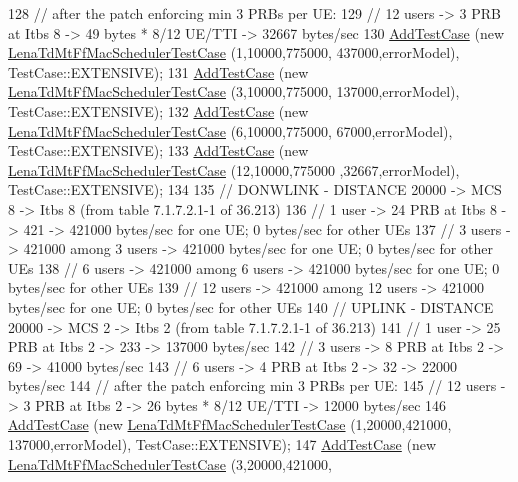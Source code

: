 \begin{DoxyCode}
128   \textcolor{comment}{// after the patch enforcing min 3 PRBs per UE:}
129   \textcolor{comment}{// 12 users -> 3 PRB at Itbs 8 -> 49 bytes * 8/12 UE/TTI -> 32667 bytes/sec}
130   \hyperlink{classns3_1_1TestCase_a3718088e3eefd5d6454569d2e0ddd835}{AddTestCase} (\textcolor{keyword}{new} \hyperlink{classLenaTdMtFfMacSchedulerTestCase}{LenaTdMtFfMacSchedulerTestCase} (1,10000,775000,
      437000,errorModel), TestCase::EXTENSIVE);
131   \hyperlink{classns3_1_1TestCase_a3718088e3eefd5d6454569d2e0ddd835}{AddTestCase} (\textcolor{keyword}{new} \hyperlink{classLenaTdMtFfMacSchedulerTestCase}{LenaTdMtFfMacSchedulerTestCase} (3,10000,775000,
      137000,errorModel), TestCase::EXTENSIVE);
132   \hyperlink{classns3_1_1TestCase_a3718088e3eefd5d6454569d2e0ddd835}{AddTestCase} (\textcolor{keyword}{new} \hyperlink{classLenaTdMtFfMacSchedulerTestCase}{LenaTdMtFfMacSchedulerTestCase} (6,10000,775000,
      67000,errorModel), TestCase::EXTENSIVE);
133   \hyperlink{classns3_1_1TestCase_a3718088e3eefd5d6454569d2e0ddd835}{AddTestCase} (\textcolor{keyword}{new} \hyperlink{classLenaTdMtFfMacSchedulerTestCase}{LenaTdMtFfMacSchedulerTestCase} (12,10000,775000
      ,32667,errorModel), TestCase::EXTENSIVE);
134  
135   \textcolor{comment}{// DONWLINK - DISTANCE 20000 -> MCS 8 -> Itbs 8 (from table 7.1.7.2.1-1 of 36.213)}
136   \textcolor{comment}{// 1 user -> 24 PRB at Itbs 8 -> 421 -> 421000 bytes/sec for one UE; 0 bytes/sec for other UEs}
137   \textcolor{comment}{// 3 users -> 421000 among 3 users -> 421000 bytes/sec for one UE; 0 bytes/sec for other UEs}
138   \textcolor{comment}{// 6 users -> 421000 among 6 users -> 421000 bytes/sec for one UE; 0 bytes/sec for other UEs}
139   \textcolor{comment}{// 12 users -> 421000 among 12 users -> 421000 bytes/sec for one UE; 0 bytes/sec for other UEs}
140   \textcolor{comment}{// UPLINK - DISTANCE 20000 -> MCS 2 -> Itbs 2 (from table 7.1.7.2.1-1 of 36.213)}
141   \textcolor{comment}{// 1 user -> 25 PRB at Itbs 2 -> 233 -> 137000 bytes/sec}
142   \textcolor{comment}{// 3 users -> 8 PRB at Itbs 2 -> 69 -> 41000 bytes/sec}
143   \textcolor{comment}{// 6 users -> 4 PRB at Itbs 2 -> 32 -> 22000 bytes/sec}
144   \textcolor{comment}{// after the patch enforcing min 3 PRBs per UE:}
145   \textcolor{comment}{// 12 users -> 3 PRB at Itbs 2 -> 26 bytes * 8/12 UE/TTI -> 12000 bytes/sec}
146   \hyperlink{classns3_1_1TestCase_a3718088e3eefd5d6454569d2e0ddd835}{AddTestCase} (\textcolor{keyword}{new} \hyperlink{classLenaTdMtFfMacSchedulerTestCase}{LenaTdMtFfMacSchedulerTestCase} (1,20000,421000,
      137000,errorModel), TestCase::EXTENSIVE);
147   \hyperlink{classns3_1_1TestCase_a3718088e3eefd5d6454569d2e0ddd835}{AddTestCase} (\textcolor{keyword}{new} \hyperlink{classLenaTdMtFfMacSchedulerTestCase}{LenaTdMtFfMacSchedulerTestCase} (3,20000,421000,

\end{DoxyCode}
